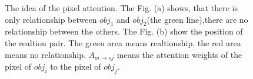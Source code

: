 \begin{figure}[htbp]
	\centering
	\caption[The idea of the pixel attention loss]{The idea of the pixel attention. The Fig. (a) shows, that there is only relationship between $obj_1$ and $obj_2$(the green line),there are no relationship between the others. The Fig. (b) show the position of the realtion pair. The green area means realtionship, the red area means no relationship. $A_{oi \to oj}$ means the attention weights of the pixel of $obj_i$ to  the pixel of $obj_j$.}
	\label{fig:idea_pixelloss}
\end{figure}

